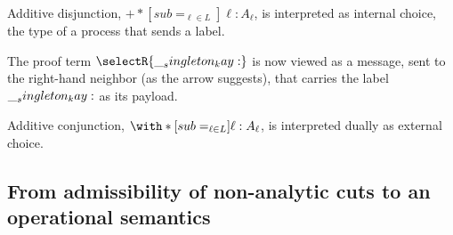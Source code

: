 Additive disjunction, $\plus*[sub=_{\ell \in L}]{\ell:A_{\ell}}$, is interpreted as internal choice, the type of a process that sends a label.
The proof term $\selectR{\kay}$ is now viewed as a message, sent to the right-hand neighbor (as the arrow suggests), that carries the label $\__singleton_kay:$ as its payload.

Additive conjunction, $\with*[sub=_{\ell \in L}]{\ell:A_{\ell}}$, is interpreted dually as external choice.






\subsection{From admissibility of non-analytic cuts to an operational semantics}

